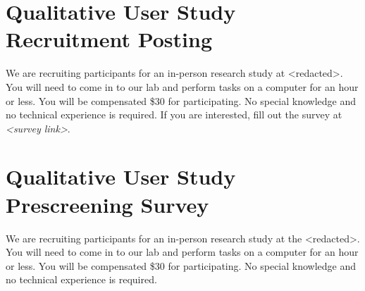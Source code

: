 \documentclass[USenglish,oneside,twocolumn]{article}
\begin{document}



\appendix

\section{Qualitative User Study Recruitment Posting} 
\label{qualitative-recruitment}
We are recruiting participants for an in-person research study at <redacted>. %
You will need to come in to our lab and perform tasks on a computer for an hour or less. You will be compensated \$30 for participating. 
No special knowledge and no technical experience is required. If you are interested, fill out the survey at \textit{<survey link>}. 

\section{Qualitative User Study Prescreening Survey} 
\label{qualitative-prescreening}
We are recruiting participants for an in-person research study at the <redacted>. %
You will need to come in to our lab and perform tasks on a computer for an hour or less. You will be compensated \$30 for participating. No special knowledge and no technical experience is required.\\
\end{document}
